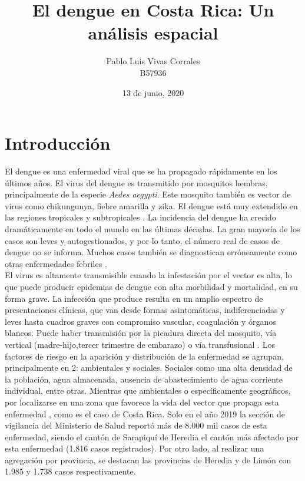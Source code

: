 \documentclass[a4paper,12pt]{report}
\title{El dengue en Costa Rica: Un análisis espacial}
\author{Pablo Luis Vivas Corrales\\
B57936}
\date{13 de junio, 2020}
\begin{document}
\linespread{1.25}
\maketitle
	
\section*{Introducción}
El dengue es una enfermedad viral que se ha propagado rápidamente en los últimos años. El virus del dengue es transmitido por mosquitos hembras, principalmente de la especie \textit{Aedes aegypti}. Este mosquito también es vector de virus como chikungunya, fiebre amarilla y zika. El dengue está muy extendido en las regiones tropicales y subtropicales \cite{OMS}. La incidencia del dengue ha crecido dramáticamente en todo el mundo en las últimas décadas. La gran mayoría de los casos son leves y autogestionados, y por lo tanto, el número real de casos de dengue no se informa. Muchos casos también se diagnostican erróneamente como otras enfermedades febriles \cite{Waggoner2016}.\\
El virus es altamente transmisible cuando la infestación por el vector es alta, lo que puede producir epidemias de dengue con alta morbilidad y mortalidad, en su forma grave. La infección que produce resulta en un amplio espectro de presentaciones clínicas, que van desde formas asintomáticas, indiferenciadas y leves hasta cuadros graves con compromiso vascular, coagulación y órganos blancos. Puede haber transmisión por la picadura directa del mosquito, vía vertical (madre-hijo,tercer trimestre de embarazo) o vía transfusional \cite{CajaCostarricensedelSeguroSocial2013}.
Los factores de riesgo en la aparición y distribución de la enfermedad se agrupan, principalmente en 2: ambientales y sociales. Sociales como una alta densidad de la población, agua almacenada, ausencia de abastecimiento de agua corriente individual, entre otras. Mientras que ambientales o específicamente geográficos, por localizarse en una zona que favorece la vida del vector que propaga esta enfermedad \cite{factores}, como es el caso de Costa Rica. Solo en el año 2019 la sección de vigilancia del Ministerio de Salud reportó más de 8.000 mil casos de esta enfermedad, siendo el cantón de Sarapiquí de Heredia el cantón más afectado por esta enfermedad (1.816 casos registrados). Por otro lado, al realizar una agregación por provincia, se destacan las provincias de Heredia y de Limón con 1.985 y 1.738 casos respectivamente. \\
\end{document}
